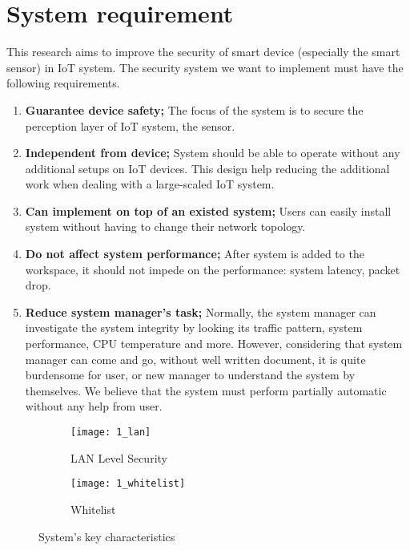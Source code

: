 \section{System requirement}
This research aims to improve the security of smart device (especially the smart sensor) in IoT system. 
The security system we want to implement must have the following requirements. 

\begin{enumerate}
    \item \textbf{Guarantee device safety;} The focus of the system is to secure the perception layer of IoT system, the sensor.  
    \item \textbf{Independent from device;} System should be able to operate without any additional setups on IoT devices. This design help reducing the additional work when dealing with a large-scaled IoT system.    
    \item \textbf{Can implement on top of an existed system;} Users can easily install system without having to change their network topology.
    \item \textbf{Do not affect system performance;} After system is added to the workspace, it should not impede on the performance: system latency, packet drop.
    \item \textbf{Reduce system manager’s task; } Normally, the system manager can investigate the system integrity by looking its traffic pattern, system performance, CPU temperature and more. However, considering that system manager can come and go, without well written document, it is quite burdensome for user, or new manager to understand the system by themselves. We believe that the system must perform partially automatic without any help from user.
\end{enumerate}

\begin{figure}
    \centering
    \begin{subfigure}[b]{0.4\textwidth}
        \centering
        \texttt{[image: 1\_lan]}
        \caption{LAN Level Security}
        \label{fig:s3_lan} 
    \end{subfigure}
    \hspace{1.5cm}
    \begin{subfigure}[b]{0.4\textwidth}
        \centering
        \texttt{[image: 1\_whitelist]}
        \caption{Whitelist}
        \label{fig:s3_whitelist}
    \end{subfigure} 
    \caption{System's key characteristics}
    \label{fig:s3_system_characteristics}
\end{figure}



